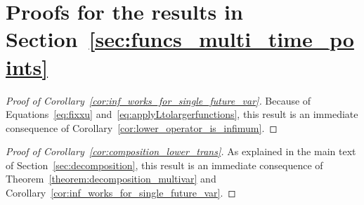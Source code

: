 \documentclass[10pt,a4paper]{paper}
\theoremstyle{definition}
\begin{document}
\section{Proofs for the results in Section~\ref{sec:funcs_multi_time_points}}

\begin{proof}[Proof of Corollary~\ref{cor:inf_works_for_single_future_var}]
Because of Equations~\eqref{eq:fixxu} and~\eqref{eq:applyLtolargerfunctions}, this result is an immediate consequence of Corollary~\ref{cor:lower_operator_is_infimum}. 
\end{proof}
\begin{proof}[Proof of Corollary~\ref{cor:composition_lower_trans}]
As explained in the main text of Section~\ref{sec:decomposition}, this result is an immediate consequence of Theorem~\ref{theorem:decomposition_multivar} and Corollary~\ref{cor:inf_works_for_single_future_var}.
\end{proof}
\end{document}
